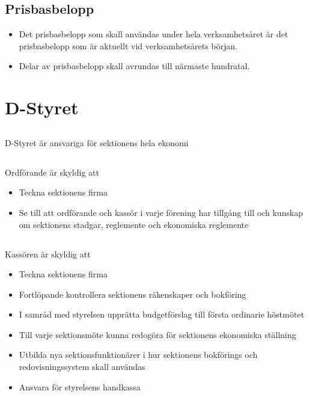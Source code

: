 \documentclass{dtek}
\begin{document}
\subsection{Prisbasbelopp}
\begin{itemize}
  \item Det prisbasbelopp som skall användas under hela verksamhetsåret är det prisbasbelopp som är aktuellt vid verksamhetsårets början.
  \item Delar av prisbasbelopp skall avrundas till närmaste hundratal. 
\end{itemize}

\section{D-Styret}
\subsection{}
D-Styret är ansvariga för sektionens hela ekonomi
\subsection{}
Ordförande är skyldig att
\begin{itemize}
  \item Teckna sektionens firma
  \item Se till att ordförande och kassör i varje förening har tillgång till och kunskap om sektionens stadgar, reglemente och ekonomiska reglemente 
\end{itemize}
\subsection{}
Kassören är skyldig att
\begin{itemize}
  \item Teckna sektionens firma
  \item Fortlöpande kontrollera sektionens räkenskaper och bokföring
  \item I samråd med styrelsen upprätta budgetförslag till första ordinarie höstmötet
  \item Till varje sektionsmöte kunna redogöra för sektionens ekonomiska ställning
  \item Utbilda nya sektionsfunktionärer i hur sektionens bokförings och redovisningssystem skall användas
  \item Ansvara för styrelsens handkassa
\end{itemize}
\end{document}
